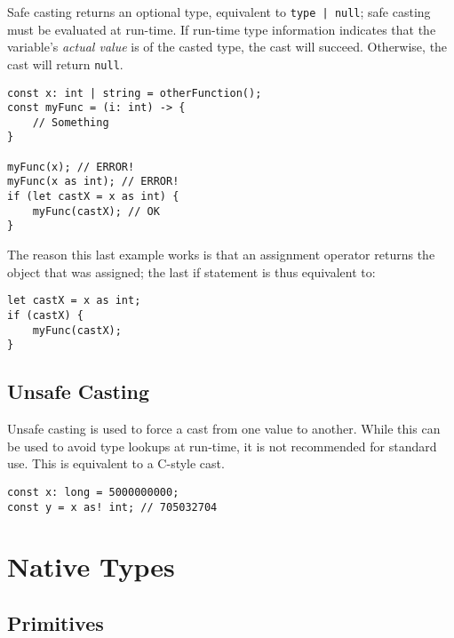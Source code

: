\documentclass[12pt]{article}
\begin{document}
Safe casting returns an optional type, equivalent to \lstinline!type | null!; safe casting must be evaluated at run-time. If run-time type information indicates that the variable's \emph{actual value} is of the casted type, the cast will succeed. Otherwise, the cast will return \lstinline!null!.

\begin{lstlisting}
const x: int | string = otherFunction();
const myFunc = (i: int) -> {
	// Something
}

myFunc(x); // ERROR!
myFunc(x as int); // ERROR!
if (let castX = x as int) {
	myFunc(castX); // OK
}
\end{lstlisting}

The reason this last example works is that an assignment operator returns the object that was assigned; the last if statement is thus equivalent to:

\begin{lstlisting}
let castX = x as int;
if (castX) {
	myFunc(castX);
}
\end{lstlisting}

\subsection{Unsafe Casting}

Unsafe casting is used to force a cast from one value to another. While this can be used to avoid type lookups at run-time, it is not recommended for standard use. This is equivalent to a C-style cast.

\begin{lstlisting}
const x: long = 5000000000;
const y = x as! int; // 705032704
\end{lstlisting}

\section{Native Types}

\subsection{Primitives}
\end{document}

